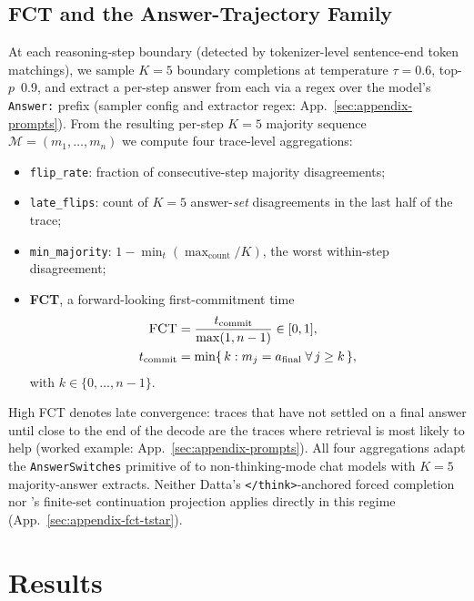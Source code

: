 \documentclass[11pt]{article}
\begin{document}
\subsection{FCT and the Answer-Trajectory Family}
\label{sec:methods-fct}

At each reasoning-step boundary (detected by tokenizer-level sentence-end token matchings), we sample $K{=}5$ boundary completions at temperature $\tau{=}0.6$, top-$p$~0.9, and extract a per-step answer from each via a regex over the model's \texttt{Answer:} prefix (sampler config and extractor regex: App.~\ref{sec:appendix-prompts}). From the resulting per-step $K{=}5$ majority sequence $\mathcal{M} = (m_1, \ldots, m_n)$ we compute four trace-level aggregations:
\begin{itemize}
\item \texttt{flip\_rate}: fraction of consecutive-step majority disagreements;
\item \texttt{late\_flips}: count of $K{=}5$ answer-\emph{set} disagreements in the last half of the trace;
\item \texttt{min\_majority}: $1 - \min_t (\max_{\text{count}}/K)$, the worst within-step disagreement;
\item \textbf{FCT}, a forward-looking first-commitment time
\begin{equation}
\begin{aligned}
\textsc{FCT} &= \frac{t_{\text{commit}}}{\max(1, n - 1)} \in [0, 1], \\
t_{\text{commit}} &= \min\{\, k : m_j = a_{\text{final}} \;\forall\, j \geq k \,\},
\end{aligned}
\label{eq:fct}
\end{equation}
\noindent with $k \in \{0, \dots, n{-}1\}$.
\end{itemize}
\noindent High FCT denotes late convergence: traces that have not settled on a final answer until close to the end of the decode are the traces where retrieval is most likely to help (worked example: App.~\ref{sec:appendix-prompts}). All four aggregations adapt the \texttt{AnswerSwitches} primitive of \citet{datta_large_2026} to non-thinking-mode chat models with $K{=}5$ majority-answer extracts. Neither Datta's \texttt{</think>}-anchored forced completion nor \citeauthor{zhang_when_2026}'s finite-set continuation projection applies directly in this regime (App.~\ref{sec:appendix-fct-tstar}).

\section{Results}
\label{sec:results}
\end{document}
